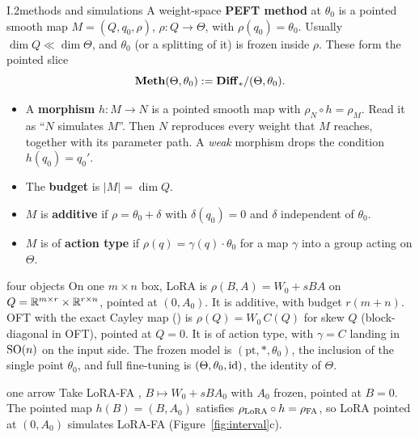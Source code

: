 \begin{definition}{I.2}{methods and simulations}
A weight-space \textbf{PEFT method} at $\theta_0$ is a pointed smooth map $M=(Q,q_0,\rho)$, $\rho:Q\to\Theta$, with
$\rho(q_0)=\theta_0$. Usually $\dim Q\ll\dim\Theta$, and $\theta_0$ (or a splitting of it) is frozen inside $\rho$. These
form the pointed slice
\begin{equation*}
  \mathbf{Meth}(\Theta,\theta_0):=\mathbf{Diff}_*/(\Theta,\theta_0).
\end{equation*}
\begin{itemize}
  \item A \textbf{morphism} $h:M\to N$ is a pointed smooth map with $\rho_N\circ h=\rho_M$. Read it as ``$N$ simulates $M$''.
    Then $N$ reproduces every weight that $M$ reaches, together with its parameter path. A \emph{weak} morphism drops the
    condition $h(q_0)=q_0'$.
  \item The \textbf{budget} is $\lvert M\rvert=\dim Q$.
  \item $M$ is \textbf{additive} if $\rho=\theta_0+\delta$ with $\delta(q_0)=0$ and $\delta$ independent of $\theta_0$.
  \item $M$ is of \textbf{action type} if $\rho(q)=\gamma(q)\cdot\theta_0$ for a map $\gamma$ into a group acting on $\Theta$.
\end{itemize}
\end{definition}

\begin{example*}{four objects}
On one $m\times n$ box, LoRA \citep{hu2021lora} is $\rho(B,A)=W_0+sBA$ on $Q=\mathbb{R}^{m\times r}\times\mathbb{R}^{r\times n}$, pointed
at $(0,A_0)$. It is additive, with budget $r(m+n)$. OFT \citep{qiu2023controlling} with the exact Cayley map
() is $\rho(Q)=W_0\,C(Q)$ for skew $Q$ (block-diagonal in OFT), pointed at $Q=0$. It is of action type, with
$\gamma=C$ landing in $\mathrm{SO}(n)$ on the input side. The frozen model is $(\mathrm{pt},*,\theta_0)$, the inclusion of the
single point $\theta_0$, and full fine-tuning is $(\Theta,\theta_0,\mathrm{id})$, the identity of $\Theta$.
\end{example*}

\begin{example*}{one arrow}
Take LoRA-FA \citep{zhang2023lora}, $B\mapsto W_0+sBA_0$ with $A_0$ frozen, pointed at $B=0$. The pointed map
$h(B)=(B,A_0)$ satisfies $\rho_{\rm LoRA}\circ h=\rho_{\rm FA}$, so LoRA pointed at $(0,A_0)$ simulates LoRA-FA
(Figure~\ref{fig:interval}c).
\end{example*}

